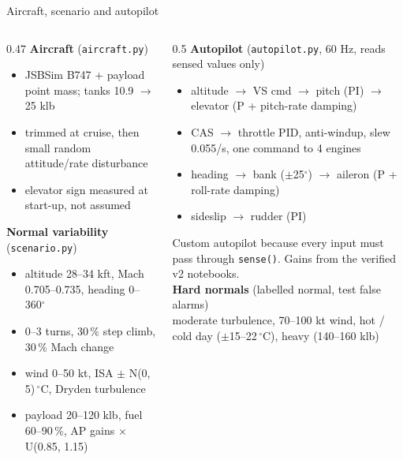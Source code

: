 \documentclass[aspectratio=169,11pt]{beamer}
\begin{document}
\begin{frame}{Aircraft, scenario and autopilot}
  \begin{columns}[T]
    \begin{column}{0.47\textwidth}
      \textbf{Aircraft} {\color{muted}\scriptsize (\texttt{aircraft.py})}
      \begin{itemize}\scriptsize
        \item JSBSim B747 + payload point mass; tanks 10.9 $\rightarrow$ 25 klb
        \item trimmed at cruise, then small random attitude/rate disturbance
        \item elevator sign measured at start-up, not assumed
      \end{itemize}
      \textbf{Normal variability} {\color{muted}\scriptsize (\texttt{scenario.py})}
      \begin{itemize}\scriptsize
        \item altitude 28--34 kft, Mach 0.705--0.735, heading 0--360$^\circ$
        \item 0--3 turns, 30\,\% step climb, 30\,\% Mach change
        \item wind 0--50 kt, ISA $\pm$ N(0, 5)\,$^\circ$C, Dryden turbulence
        \item payload 20--120 klb, fuel 60--90\,\%, AP gains $\times$U(0.85, 1.15)
      \end{itemize}
    \end{column}
    \begin{column}{0.5\textwidth}
      \textbf{Autopilot} {\color{muted}\scriptsize (\texttt{autopilot.py}, 60 Hz, reads sensed values only)}
      \begin{itemize}\scriptsize
        \item altitude $\rightarrow$ VS cmd $\rightarrow$ pitch (PI) $\rightarrow$ elevator (P + pitch-rate damping)
        \item CAS $\rightarrow$ throttle PID, anti-windup, slew 0.055/s, one command to 4 engines
        \item heading $\rightarrow$ bank ($\pm$25$^\circ$) $\rightarrow$ aileron (P + roll-rate damping)
        \item sideslip $\rightarrow$ rudder (PI)
      \end{itemize}
      \vspace{0.2em}
      {\color{muted}\scriptsize Custom autopilot because every input must pass through \texttt{sense()}. Gains from the verified v2 notebooks.}\\[0.4em]
      \textbf{Hard normals} {\color{muted}\scriptsize (labelled normal, test false alarms)}\\
      {\scriptsize moderate turbulence, 70--100 kt wind, hot / cold day ($\pm$15--22\,$^\circ$C), heavy (140--160 klb)}
    \end{column}
  \end{columns}
\end{frame}
\end{document}
